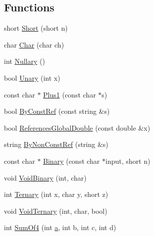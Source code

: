 \subsection*{Functions}
\begin{DoxyCompactItemize}
\item 
short \hyperlink{namespacetesting_1_1gmock__generated__actions__test_a7c442b3594b6717b8d499781a82170b2}{Short} (short n)
\item 
char \hyperlink{namespacetesting_1_1gmock__generated__actions__test_aa07e216a4c9d492fb7e7c8fde949bc8f}{Char} (char ch)
\item 
int \hyperlink{namespacetesting_1_1gmock__generated__actions__test_acb3d926ebbe88529c38d95f5e61573ef}{Nullary} ()
\item 
bool \hyperlink{namespacetesting_1_1gmock__generated__actions__test_a61f0e6c3f2c07079299f1d6e1667ab92}{Unary} (int x)
\item 
const char $\ast$ \hyperlink{namespacetesting_1_1gmock__generated__actions__test_a75e901c6d28c591c53a54320a294da55}{Plus1} (const char $\ast$s)
\item 
bool \hyperlink{namespacetesting_1_1gmock__generated__actions__test_a5886409b3306d3ff2fe548f9747f1de8}{By\+Const\+Ref} (const string \&s)
\item 
bool \hyperlink{namespacetesting_1_1gmock__generated__actions__test_a3e552b41de08f0516f4b0e32fed68a61}{References\+Global\+Double} (const double \&x)
\item 
string \hyperlink{namespacetesting_1_1gmock__generated__actions__test_a2d12f232cedb11c5955db0ebb1429eb2}{By\+Non\+Const\+Ref} (string \&s)
\item 
const char $\ast$ \hyperlink{namespacetesting_1_1gmock__generated__actions__test_a3ec2020ddbfa6f2e993e0f88be1e691f}{Binary} (const char $\ast$input, short n)
\item 
void \hyperlink{namespacetesting_1_1gmock__generated__actions__test_af957302d6c2b4dacd31385f2a34b529f}{Void\+Binary} (int, char)
\item 
int \hyperlink{namespacetesting_1_1gmock__generated__actions__test_a1b234626e33284c4159ea666d240d5ed}{Ternary} (int x, char y, short z)
\item 
void \hyperlink{namespacetesting_1_1gmock__generated__actions__test_a7b1b519421c70b90ea3c818d4cf565ac}{Void\+Ternary} (int, char, bool)
\item 
int \hyperlink{namespacetesting_1_1gmock__generated__actions__test_a2a5879c060adacf27c3528260172a7be}{Sum\+Of4} (int \hyperlink{_07copy_08_2_read_camera_model_8m_a551a3d351eadcc0b9b1a2f24f0fb5ea0}{a}, int b, int c, int d)

\end{DoxyCompactItemize}
